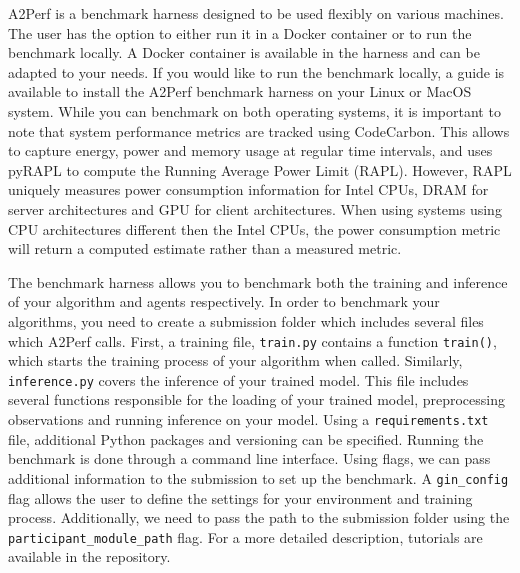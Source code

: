 A2Perf is a benchmark harness designed to be used flexibly on various machines. The user has the option to either run it in a Docker container or to run the benchmark locally. A Docker container is available in the harness and can be adapted to your needs. If you would like to run the benchmark locally, a guide is available to install the A2Perf benchmark harness on your Linux or MacOS system. While you can benchmark on both operating systems, it is important to note that system performance metrics are tracked using CodeCarbon. This allows to capture energy, power and memory usage at regular time intervals, and uses pyRAPL to compute the Running Average Power Limit (RAPL). However, RAPL uniquely measures power consumption information for Intel CPUs, DRAM for server architectures and GPU for client architectures. When using systems using CPU architectures different then the Intel CPUs, the power consumption metric will return a computed estimate rather than a measured metric.

The benchmark harness allows you to benchmark both the training and inference of your algorithm and agents respectively. In order to benchmark your algorithms, you need to create a submission folder which includes several files which A2Perf calls. First, a training file, \texttt{train.py} contains a function \texttt{train()}, which starts the training process of your algorithm when called. Similarly, \texttt{inference.py} covers the inference of your trained model. This file includes several functions responsible for the loading of your trained model, preprocessing observations and running inference on your model. Using a \texttt{requirements.txt} file, additional Python packages and versioning can be specified. Running the benchmark is done through a command line interface. Using flags, we can pass additional information to the submission to set up the benchmark. A \texttt{gin\_config} flag allows the user to define the settings for your environment and training process. Additionally, we need to pass the path to the submission folder using the \texttt{participant\_module\_path} flag. For a more detailed description, tutorials are available in the repository.
